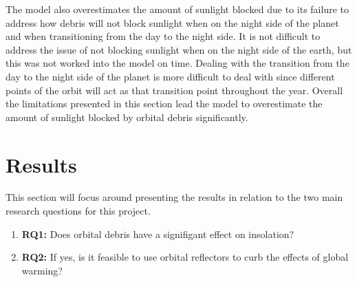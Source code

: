 \documentclass[11pt]{article}
\begin{document}
\begin{multicols*}{2}
The model also overestimates the amount of sunlight blocked due to its failure to address how debris will not block sunlight when on the night side of the planet and when transitioning from the day to the night side. It is not difficult to address the issue of not blocking sunlight when on the night side of the earth, but this was not worked into the model on time. Dealing with the transition from the day to the night side of the planet is more difficult to deal with since different points of the orbit will act as that transition point throughout the year. Overall the limitations presented in this section lead the model to overestimate the amount of sunlight blocked by orbital debris significantly.
\section{Results} \label{results}
This section will focus around presenting the results in relation to the two main research questions for this project. 
\begin{enumerate}
	\item \textbf{RQ1:} Does orbital debris have a signifigant effect on insolation?
	\item \textbf{RQ2:} If yes, is it feasible to use orbital reflectors to curb the effects of global warming?
\end{enumerate}


\end{multicols*}
\end{document}

